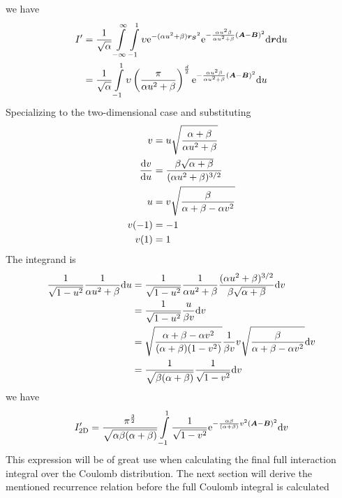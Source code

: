     we have
        \begin{align}
            I' &= \frac{1}{\sqrt{\alpha}}\int\limits^{\infty}_{-\infty} \int\limits^1_{-1} \upsilon
            \mathrm{e}^{-(\alpha u^2 + \beta)\boldsymbol{{r_S}}^2} \mathrm{e}^{-\frac{\alpha
            u^2\beta}{\alpha u^2 + \beta} (\boldsymbol{{A}}-\boldsymbol{{B}})^2} \mathrm{d}\boldsymbol{{r}}\mathrm{d}
            u \nonumber \\
            &= \frac{1}{\sqrt{\alpha}}\int\limits^1_{-1} \upsilon
            \left(\frac{\pi}{\alpha u^2 + \beta}\right)^{\frac{d}{2}}
            \mathrm{e}^{-\frac{\alpha u^2\beta}{\alpha u^2 +
            \beta}(\boldsymbol{{A}}-\boldsymbol{{B}})^2} \mathrm{d} u
        \end{align}
    Specializing to the two-dimensional case and substituting
        \begin{equation}
            \begin{aligned}
                v &= u\sqrt{\frac{\alpha+\beta}{\alpha u^2 + \beta}} \\
                \frac{\mathrm{d} v}{\mathrm{d} u} &= \frac{\beta\sqrt{\alpha+\beta}}{(\alpha
                u^2 + \beta)^{3/2}} \\
                u &= v \sqrt{\frac{\beta}{\alpha+\beta - \alpha v^2}} \\
                v(-1) &= -1 \\
                v(1) &= 1
            \end{aligned}
        \end{equation}
    The integrand is
        \begin{align}
            \frac{1}{\sqrt{1 - u^2}} \frac{1}{\alpha u^2 + \beta} \mathrm{d} u &=
            \frac{1}{\sqrt{1-u^2}} \frac{1}{\alpha u^2 + \beta} \frac{(\alpha
            u^2 + \beta)^{3/2}}{\beta\sqrt{\alpha+\beta}}\mathrm{d} v \nonumber \\
            &= \frac{1}{\sqrt{1-u^2}} \frac{u}{\beta v}\mathrm{d} v \nonumber \\
            &= \sqrt{\frac{\alpha+\beta -\alpha
            v^2}{(\alpha+\beta)(1-v^2)}}\frac{1}{\beta
            v}v\sqrt{\frac{\beta}{\alpha+\beta-\alpha v^2}} \mathrm{d} v \nonumber \\
            &= \frac{1}{\sqrt{\beta(\alpha+\beta)}} \frac{1}{\sqrt{1 - v^2}}
            \mathrm{d} v
        \end{align}
    we have
        \begin{equation}
            I'_{\text{2D}} =
            \frac{\pi^{\frac{3}{2}}}{\sqrt{\alpha\beta(\alpha+\beta)}}
            \int\limits^{1}_{-1} \frac{1}{\sqrt{1 - v^2}}
            \mathrm{e}^{-\frac{\alpha\beta}{(\alpha + \beta)}v^2(\boldsymbol{{A}}-\boldsymbol{{B}})^2}
            \mathrm{d} v
            \label{eq:coulombInteractionSimpleFinal}
        \end{equation}
    This expression will be of great use when calculating the final full
    interaction integral over the Coulomb distribution. The next section will
    derive the mentioned recurrence relation before the full Coulomb integral
    is calculated

